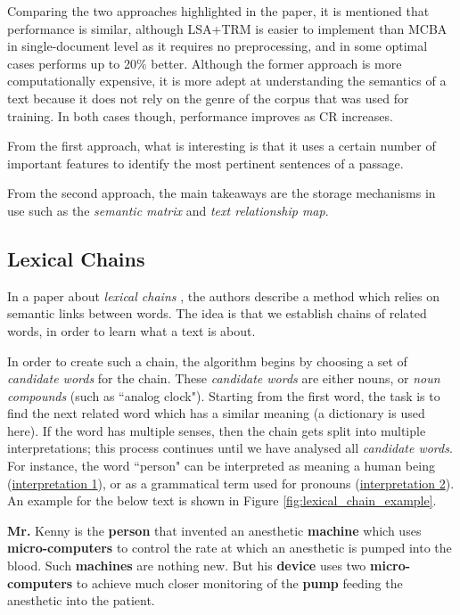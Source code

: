 Comparing the two approaches highlighted in the paper, it is mentioned that performance is similar, although LSA+TRM is easier to implement than MCBA in single-document level as it requires no preprocessing, and in some optimal cases performs up to 20\% better. Although the former approach is more computationally expensive, it is more adept at understanding the semantics of a text because it does not rely on the genre of the corpus that was used for training. In both cases though, performance improves as CR increases.

\mbox{}

From the first approach, what is interesting is that it uses a certain number of important features to identify the most pertinent sentences of a passage.

From the second approach, the main takeaways are the storage mechanisms in use such as the \textit{semantic matrix} and \textit{text relationship map}.

\subsection{Lexical Chains}

In a paper about \textit{lexical chains} \cite{barzilay_using_1997}, the authors describe a method which relies on semantic links between words. The idea is that we establish chains of related words, in order to learn what a text is about.

In order to create such a chain, the algorithm begins by choosing a set of \textit{candidate words} for the chain. These \textit{candidate words} are either nouns, or \textit{noun compounds} (such as ``analog clock"). Starting from the first word, the task is to find the next related word which has a similar meaning (a dictionary is used here). If the word has multiple senses, then the chain gets split into multiple interpretations; this process continues until we have analysed all \textit{candidate words}.  For instance, the word ``person" can be interpreted as meaning a human being (\underline{interpretation 1}), or as a grammatical term used for pronouns (\underline{interpretation 2}). An example for the below text is shown in Figure \ref{fig:lexical_chain_example}.

\begin{displayquote}
\textbf{Mr.} Kenny is the \textbf{person} that invented an anesthetic \textbf{machine} which uses \textbf{micro-computers} to control the rate at which an anesthetic is pumped into the blood. Such \textbf{machines} are nothing new. But his \textbf{device} uses two \textbf{micro-computers} to achieve much closer monitoring of the \textbf{pump} feeding the anesthetic into the patient. \cite{barzilay_using_1997}
\end{displayquote}

